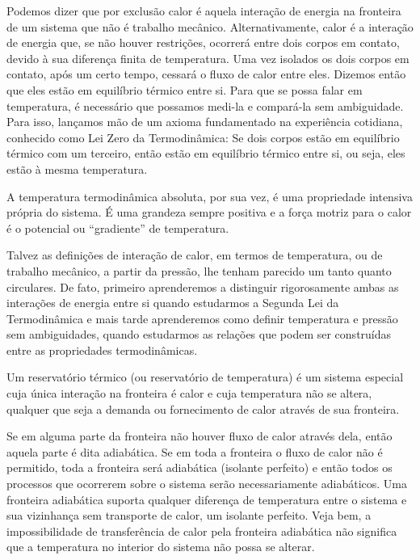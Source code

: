     Podemos dizer que por exclusão calor é aquela interação de energia na
    fronteira de um sistema que não é trabalho mecânico. Alternativamente,
    calor é a interação de energia que, se não houver restrições, ocorrerá
    entre dois corpos em contato, devido à sua diferença finita de temperatura.
    Uma vez isolados os dois corpos em contato, após um certo tempo, cessará o
    fluxo de calor entre eles. Dizemos então que eles estão em equilíbrio
    térmico entre si. Para que se possa falar em temperatura, é necessário que
    possamos medi-la e compará-la sem ambiguidade. Para isso, lançamos mão de
    um axioma fundamentado na experiência cotidiana, conhecido como Lei Zero da
    Termodinâmica: Se dois corpos estão em equilíbrio térmico com um terceiro,
    então estão em equilíbrio térmico entre si, ou seja, eles estão à mesma
    temperatura.

    A temperatura termodinâmica absoluta, por sua vez, é uma propriedade
    intensiva própria do sistema. É uma grandeza sempre positiva e a força
    motriz para o calor é o potencial ou \enquote{gradiente} de temperatura.

    Talvez as definições de interação de calor, em termos de temperatura, ou de
    trabalho mecânico, a partir da pressão, lhe tenham parecido um tanto quanto
    circulares. De fato, primeiro aprenderemos a distinguir rigorosamente ambas
    as interações de energia entre si quando estudarmos a Segunda Lei da
    Termodinâmica e mais tarde aprenderemos como definir temperatura e pressão
    sem ambiguidades, quando estudarmos as relações que podem ser construídas
    entre as propriedades termodinâmicas.

    Um reservatório térmico (ou reservatório de temperatura) é um sistema
    especial cuja única interação na fronteira é calor e cuja temperatura não
    se altera, qualquer que seja a demanda ou fornecimento de calor através de
    sua fronteira.

    Se em alguma parte da fronteira não houver fluxo de calor através dela,
    então aquela parte é dita adiabática.  Se em toda a fronteira o fluxo de
    calor não é permitido, toda a fronteira será adiabática (isolante perfeito)
    e então todos os processos que ocorrerem sobre o sistema serão
    necessariamente adiabáticos. Uma fronteira adiabática suporta qualquer
    diferença de temperatura entre o sistema e sua vizinhança sem transporte de
    calor, um isolante perfeito. Veja bem, a impossibilidade de transferência
    de calor pela fronteira adiabática não significa que a temperatura no
    interior do sistema não possa se alterar.

